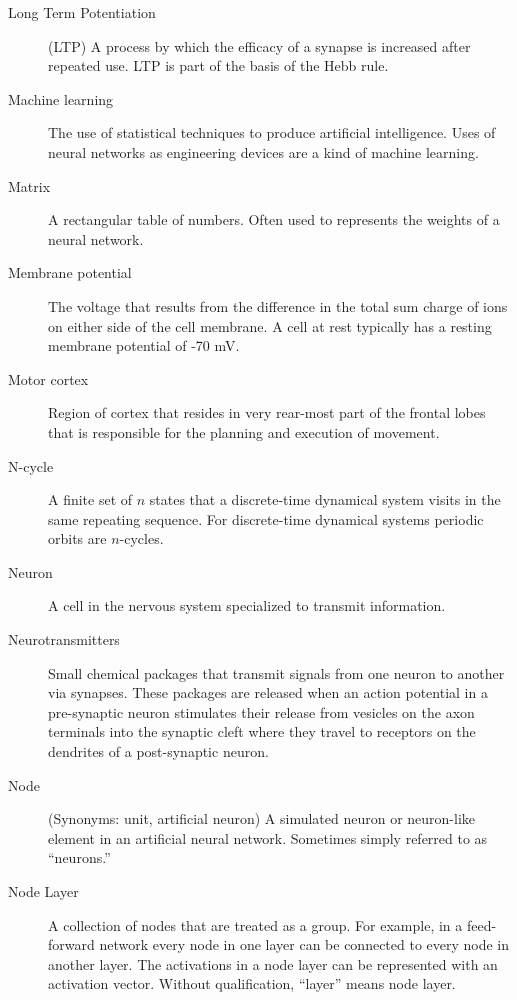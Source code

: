 \begin{description}
\item[Long Term Potentiation] (LTP) A process by which the efficacy of a synapse is increased after repeated use. LTP is part of the basis of the Hebb rule.

\item[Machine learning] The use of statistical techniques to produce artificial intelligence. Uses of neural networks as engineering devices are a kind of machine learning.

\item[Matrix] A rectangular table of numbers. Often used to represents the weights of a neural network.

\item[Membrane potential] The voltage that results from the difference in the total sum charge of ions on either side of the cell membrane. A cell at rest typically has a resting membrane potential of -70 mV. 


\item[Motor cortex] Region of cortex that resides in very rear-most part of the frontal lobes that is responsible for the planning and execution of movement. 

\item[N-cycle] A finite set of $n$ states that a discrete-time dynamical system visits in the same repeating sequence. For discrete-time dynamical systems periodic orbits are $n$-cycles.

\item[Neuron] A cell in the nervous system specialized to transmit information.

\item[Neurotransmitters] Small chemical packages that transmit signals from one neuron to another via synapses. These packages are released when an action potential in a pre-synaptic neuron stimulates their release from vesicles on the axon terminals into the synaptic cleft where they travel to receptors on the dendrites of a post-synaptic neuron. 

\item[Node] (Synonyms: unit, artificial neuron) A simulated neuron or neuron-like element in an artificial neural network.  Sometimes simply referred to as ``neurons.''

\item[Node Layer] A collection of nodes that are treated as a group. For example, in a feed-forward network every node in one layer can be connected to every node in another layer. The activations in a node layer can be represented with an activation vector. Without qualification, ``layer'' means node layer.


\end{description}
